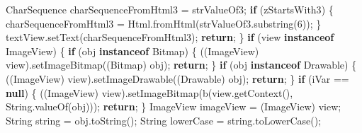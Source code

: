 \documentclass[
]{article}
\newenvironment{Shaded}{}{}
\newcommand{\BuiltInTok}[1]{\textcolor[rgb]{0.00,0.50,0.00}{#1}}
\newcommand{\ControlFlowTok}[1]{\textcolor[rgb]{0.00,0.44,0.13}{\textbf{#1}}}
\newcommand{\DecValTok}[1]{\textcolor[rgb]{0.25,0.63,0.44}{#1}}
\newcommand{\FunctionTok}[1]{\textcolor[rgb]{0.02,0.16,0.49}{#1}}
\newcommand{\KeywordTok}[1]{\textcolor[rgb]{0.00,0.44,0.13}{\textbf{#1}}}
\newcommand{\NormalTok}[1]{#1}
\newcommand{\OperatorTok}[1]{\textcolor[rgb]{0.40,0.40,0.40}{#1}}
\begin{document}
\begin{Shaded}
\begin{Highlighting}[]
            \BuiltInTok{CharSequence}\NormalTok{ charSequenceFromHtml3 }\OperatorTok{=}\NormalTok{ strValueOf3}\OperatorTok{;}
            \ControlFlowTok{if} \OperatorTok{(}\NormalTok{zStartsWith3}\OperatorTok{)} \OperatorTok{\{}
\NormalTok{                charSequenceFromHtml3 }\OperatorTok{=}\NormalTok{ Html}\OperatorTok{.}\FunctionTok{fromHtml}\OperatorTok{(}\NormalTok{strValueOf3}\OperatorTok{.}\FunctionTok{substring}\OperatorTok{(}\DecValTok{6}\OperatorTok{));}
            \OperatorTok{\}}
\NormalTok{            textView}\OperatorTok{.}\FunctionTok{setText}\OperatorTok{(}\NormalTok{charSequenceFromHtml3}\OperatorTok{);}
            \ControlFlowTok{return}\OperatorTok{;}
        \OperatorTok{\}}
        \ControlFlowTok{if} \OperatorTok{(}\NormalTok{view }\KeywordTok{instanceof} \BuiltInTok{ImageView}\OperatorTok{)} \OperatorTok{\{}
            \ControlFlowTok{if} \OperatorTok{(}\NormalTok{obj }\KeywordTok{instanceof}\NormalTok{ Bitmap}\OperatorTok{)} \OperatorTok{\{}
                \OperatorTok{((}\BuiltInTok{ImageView}\OperatorTok{)}\NormalTok{ view}\OperatorTok{).}\FunctionTok{setImageBitmap}\OperatorTok{((}\NormalTok{Bitmap}\OperatorTok{)}\NormalTok{ obj}\OperatorTok{);}
                \ControlFlowTok{return}\OperatorTok{;}
            \OperatorTok{\}}
            \ControlFlowTok{if} \OperatorTok{(}\NormalTok{obj }\KeywordTok{instanceof}\NormalTok{ Drawable}\OperatorTok{)} \OperatorTok{\{}
                \OperatorTok{((}\BuiltInTok{ImageView}\OperatorTok{)}\NormalTok{ view}\OperatorTok{).}\FunctionTok{setImageDrawable}\OperatorTok{((}\NormalTok{Drawable}\OperatorTok{)}\NormalTok{ obj}\OperatorTok{);}
                \ControlFlowTok{return}\OperatorTok{;}
            \OperatorTok{\}}
            \ControlFlowTok{if} \OperatorTok{(}\NormalTok{iVar }\OperatorTok{==} \KeywordTok{null}\OperatorTok{)} \OperatorTok{\{}
                \OperatorTok{((}\BuiltInTok{ImageView}\OperatorTok{)}\NormalTok{ view}\OperatorTok{).}\FunctionTok{setImageBitmap}\OperatorTok{(}\FunctionTok{b}\OperatorTok{(}\NormalTok{view}\OperatorTok{.}\FunctionTok{getContext}\OperatorTok{(),} \BuiltInTok{String}\OperatorTok{.}\FunctionTok{valueOf}\OperatorTok{(}\NormalTok{obj}\OperatorTok{)));}
                \ControlFlowTok{return}\OperatorTok{;}
            \OperatorTok{\}}
            \BuiltInTok{ImageView}\NormalTok{ imageView }\OperatorTok{=} \OperatorTok{(}\BuiltInTok{ImageView}\OperatorTok{)}\NormalTok{ view}\OperatorTok{;}
            \BuiltInTok{String}\NormalTok{ string }\OperatorTok{=}\NormalTok{ obj}\OperatorTok{.}\FunctionTok{toString}\OperatorTok{();}
            \BuiltInTok{String}\NormalTok{ lowerCase }\OperatorTok{=}\NormalTok{ string}\OperatorTok{.}\FunctionTok{toLowerCase}\OperatorTok{();}

\end{Highlighting}
\end{Shaded}
\end{document}
